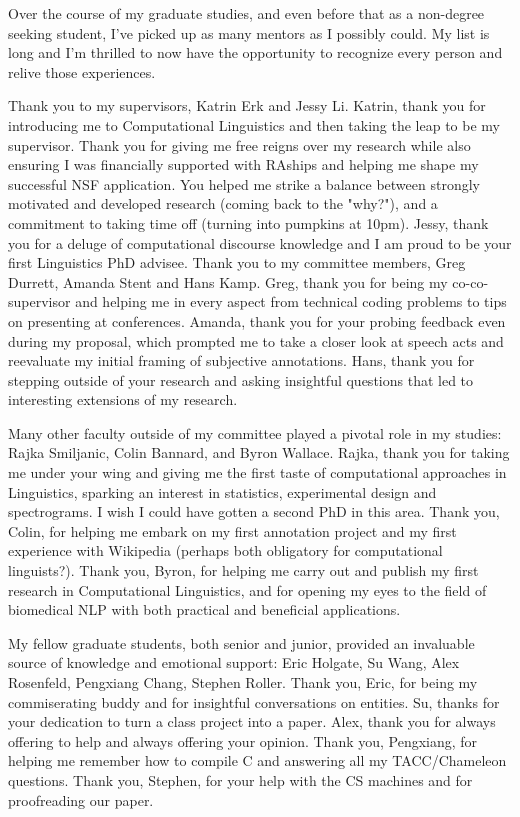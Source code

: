 Over the course of my graduate studies, and even before that as a non-degree seeking student, I've picked up as many mentors as I possibly could. My list is long and I'm thrilled to now have the opportunity to recognize every person and relive those experiences.

Thank you to my supervisors, Katrin Erk and Jessy Li. Katrin, thank you for introducing me to Computational Linguistics and then taking the leap to be my supervisor. Thank you for giving me free reigns over my research while also ensuring I was financially supported with RAships and helping me shape my successful NSF application. You helped me strike a balance between strongly motivated and developed research (coming back to the "why?"), and a commitment to taking time off (turning into pumpkins at 10pm). Jessy, thank you for a deluge of computational discourse knowledge and I am proud to be your first Linguistics PhD advisee. Thank you to my committee members, Greg Durrett, Amanda Stent and Hans Kamp. Greg, thank you for being my co-co-supervisor and helping me in every aspect from technical coding problems to tips on presenting at conferences. Amanda, thank you for your probing feedback even during my proposal, which prompted me to take a closer look at speech acts and reevaluate my initial framing of subjective annotations. Hans, thank you for stepping outside of your research and asking insightful questions that led to interesting extensions of my research.

Many other faculty outside of my committee played a pivotal role in my studies: Rajka Smiljanic, Colin Bannard, and Byron Wallace. Rajka, thank you for taking me under your wing and giving me the first taste of computational approaches in Linguistics, sparking an interest in statistics, experimental design and spectrograms. I wish I could have gotten a second PhD in this area. Thank you, Colin, for helping me embark on my first annotation project and my first experience with Wikipedia (perhaps both obligatory for computational linguists?). Thank you, Byron, for helping me carry out and publish my first research in Computational Linguistics, and for opening my eyes to the field of biomedical NLP with both practical and beneficial applications.

My fellow graduate students, both senior and junior, provided an invaluable source of knowledge and emotional support: Eric Holgate, Su Wang, Alex Rosenfeld, Pengxiang Chang, Stephen Roller. Thank you, Eric, for being my commiserating buddy and for insightful conversations on entities. Su, thanks for your dedication to turn a class project into a paper. Alex, thank you for always offering to help and always offering your opinion. Thank you, Pengxiang, for helping me remember how to compile C and answering all my TACC/Chameleon questions. Thank you, Stephen, for your help with the CS machines and for proofreading our paper.


